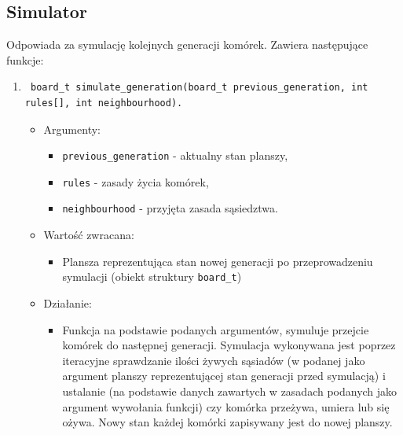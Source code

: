 \documentclass[a4paper,11pt, notitlepage ]{article}
\begin{document}
\subsection{Simulator}
Odpowiada za symulację kolejnych generacji komórek. Zawiera następujące funkcje:
\begin{enumerate}

\item \begin{verbatim} board_t simulate_generation(board_t previous_generation, int rules[], int neighbourhood). \end{verbatim}
\begin{itemize}
\item Argumenty:
\begin{itemize}
\item \verb+previous_generation+ - aktualny stan planszy,
\item \verb+rules+ - zasady życia komórek,
\item \verb+neighbourhood+ - przyjęta zasada sąsiedztwa.
\end{itemize}
\item Wartość zwracana:
\begin{itemize}
\item Plansza reprezentująca stan nowej generacji po przeprowadzeniu symulacji (obiekt struktury \verb+board_t+)
\end{itemize}
\item Działanie:
\begin{itemize}
\item Funkcja na podstawie podanych argumentów, symuluje przejcie komórek do następnej generacji. Symulacja wykonywana jest poprzez iteracyjne sprawdzanie ilości żywych sąsiadów 
(w podanej jako argument planszy reprezentującej stan generacji przed symulacją) i ustalanie (na podstawie danych zawartych w zasadach podanych jako argument wywołania funkcji) czy komórka przeżywa, umiera lub się ożywa.
Nowy stan każdej komórki zapisywany jest do nowej planszy.
\end{itemize}
\end{itemize}



\end{enumerate}
\end{document}

